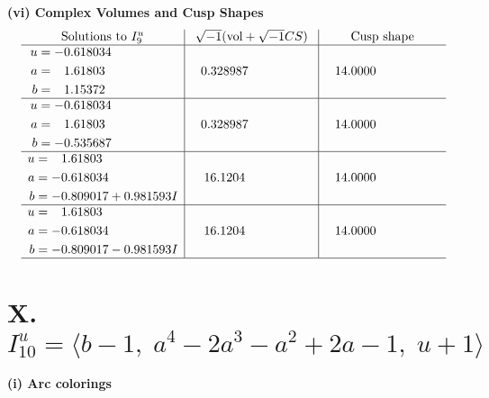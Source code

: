 \documentclass[1p]{elsarticle_modified}
\theoremstyle{definition}
\newcommand{\I}{\sqrt{-1}}
\begin{document}
\newpage\flushleft \textbf{(vi) Complex Volumes and Cusp Shapes}
$$\begin{array}{c|c|c}  
\text{Solutions to }I^u_{9}& \I (\text{vol} + \sqrt{-1}CS) & \text{Cusp shape}\\
 \hline 
\begin{aligned}
u &= -0.618034\phantom{ +0.000000I} \\
a &= \phantom{-}1.61803\phantom{ +0.000000I} \\
b &= \phantom{-}1.15372\phantom{ +0.000000I}\end{aligned}
 & \phantom{-}0.328987\phantom{ +0.000000I} & \phantom{-}14.0000\phantom{ +0.000000I} \\ \hline\begin{aligned}
u &= -0.618034\phantom{ +0.000000I} \\
a &= \phantom{-}1.61803\phantom{ +0.000000I} \\
b &= -0.535687\phantom{ +0.000000I}\end{aligned}
 & \phantom{-}0.328987\phantom{ +0.000000I} & \phantom{-}14.0000\phantom{ +0.000000I} \\ \hline\begin{aligned}
u &= \phantom{-}1.61803\phantom{ +0.000000I} \\
a &= -0.618034\phantom{ +0.000000I} \\
b &= -0.809017 + 0.981593 I\end{aligned}
 & \phantom{-}16.1204\phantom{ +0.000000I} & \phantom{-}14.0000\phantom{ +0.000000I} \\ \hline\begin{aligned}
u &= \phantom{-}1.61803\phantom{ +0.000000I} \\
a &= -0.618034\phantom{ +0.000000I} \\
b &= -0.809017 - 0.981593 I\end{aligned}
 & \phantom{-}16.1204\phantom{ +0.000000I} & \phantom{-}14.0000\phantom{ +0.000000I}\\
 \hline 
 \end{array}$$\newpage\newpage\renewcommand{\arraystretch}{1}
\centering \section*{X. $I^u_{10}= \langle b-1,\;a^4-2 a^3- a^2+2 a-1,\;u+1 \rangle$}
\flushleft \textbf{(i) Arc colorings}\\
\end{document}

